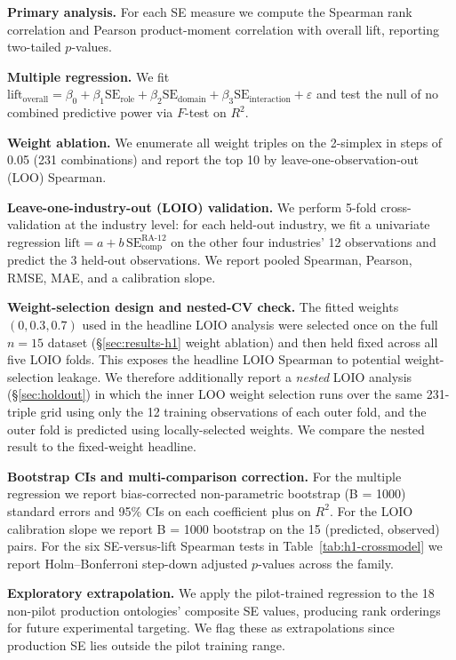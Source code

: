 \documentclass[11pt,a4paper]{article}
\newcommand{\se}{\mathrm{SE}}
\newcommand{\serole}{\se_{\text{role}}}
\newcommand{\sedom}{\se_{\text{domain}}}
\newcommand{\seint}{\se_{\text{interaction}}}
\newcommand{\secomp}{\se_{\text{comp}}}
\begin{document}
\textbf{Primary analysis.} For each SE measure we compute the Spearman
rank correlation and Pearson product-moment correlation with
overall lift, reporting two-tailed $p$-values.

\textbf{Multiple regression.} We fit
$\mathrm{lift}_{\mathrm{overall}} = \beta_0 + \beta_1 \serole + \beta_2 \sedom
+ \beta_3 \seint + \varepsilon$
and test the null of no combined predictive power via $F$-test on $R^2$.

\textbf{Weight ablation.} We enumerate all weight triples on the 2-simplex
in steps of 0.05 (231 combinations) and report the top 10 by
leave-one-observation-out (LOO) Spearman.

\textbf{Leave-one-industry-out (LOIO) validation.} We perform 5-fold
cross-validation at the industry level: for each held-out industry, we
fit a univariate regression
$\mathrm{lift} = a + b\,\secomp^{\text{RA-12}}$ on the other four
industries' 12 observations and predict the 3 held-out observations.
We report pooled Spearman, Pearson, RMSE, MAE, and a calibration slope.

\textbf{Weight-selection design and nested-CV check.} The fitted
weights $(0, 0.3, 0.7)$ used in the headline LOIO analysis were
selected once on the full $n=15$ dataset (\S\ref{sec:results-h1}
weight ablation) and then held fixed across all five LOIO folds. This
exposes the headline LOIO Spearman to potential weight-selection
leakage. We therefore additionally report a \emph{nested} LOIO
analysis (\S\ref{sec:holdout}) in which the inner LOO weight
selection runs over the same 231-triple grid using only the 12
training observations of each outer fold, and the outer fold is
predicted using locally-selected weights. We compare the nested
result to the fixed-weight headline.

\textbf{Bootstrap CIs and multi-comparison correction.} For the
multiple regression we report bias-corrected non-parametric
bootstrap (B = 1000) standard errors and 95\% CIs on each coefficient
plus on $R^2$. For the LOIO calibration slope we report B = 1000
bootstrap on the 15 (predicted, observed) pairs. For the six
SE-versus-lift Spearman tests in
Table~\ref{tab:h1-crossmodel} we report Holm--Bonferroni step-down
adjusted $p$-values across the family.

\textbf{Exploratory extrapolation.} We apply the pilot-trained regression
to the 18 non-pilot production ontologies' composite SE values, producing
rank orderings for future experimental targeting. We flag these as
extrapolations since production SE lies outside the pilot training range.
\end{document}
